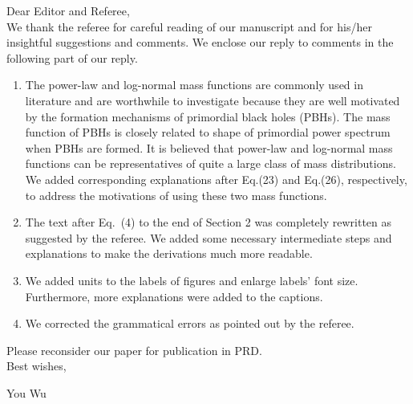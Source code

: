 \documentclass[
preprint,          %
superscriptaddress,%
amsmath,           %
amssymb,           %
aps,               %
prl,               %
notitlepage,       %
longbibliography,  %
floatfix,          %
nofootinbib,
onecolumn,
]{revtex4-1}
\begin{document}
Dear Editor and Referee, \\

We thank the referee for careful reading of our manuscript and for his/her insightful suggestions and comments. 
We enclose our reply to comments in the following part of our reply. 
\begin{enumerate}
	\item The power-law and log-normal mass functions are commonly used in literature and are worthwhile to investigate because they are well motivated by the formation mechanisms of primordial black holes (PBHs). The mass function of PBHs is closely related to shape of primordial power spectrum when PBHs are formed. It is believed that power-law and log-normal mass functions can be representatives of quite a large class of mass distributions. We added corresponding explanations after Eq.(23) and Eq.(26), respectively, to address the motivations of using these two mass functions.
    
    \item The text after Eq.~(4) to the end of Section 2 was completely rewritten as suggested by the referee. We added some necessary intermediate steps and explanations to make the derivations much more readable.
    
    \item We added units to the labels of figures and enlarge labels' font size. Furthermore, more explanations were added to the captions.
    
    \item We corrected the grammatical errors as pointed out by the referee.
    
\end{enumerate}



Please reconsider our paper for publication in PRD. \\


Best wishes, 

You Wu 

\newpage

\end{document}
